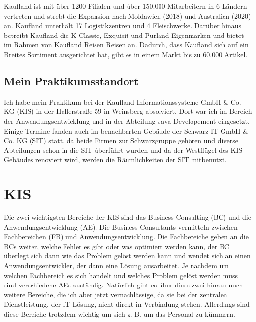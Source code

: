 Kaufland ist mit über 1200 Filialen und über 150.000 Mitarbeitern in 6 Ländern vertreten und strebt die Expansion nach Moldawien (2018) und Australien (2020) an. Kaufland unterhält 17 Logistikzentren und 4 Fleischwerke. Darüber hinaus betreibt Kaufland die            K-Classic, Exquisit und Purland Eigenmarken und bietet im Rahmen von Kaufland Reisen Reisen an. Dadurch, dass Kaufland sich auf ein Breites Sortiment ausgerichtet hat, gibt es in einem Markt bis zu 60.000 Artikel. 

\subsection{Mein Praktikumsstandort}

Ich habe mein Praktikum bei der Kaufland Informationssysteme GmbH \& Co. KG (KIS) in der Hallerstraße 59 in Weinsberg absolviert. Dort war ich im Bereich der Anwendungsentwicklung und in der Abteilung Java-Developement eingesetzt. Einige Termine fanden auch im benachbarten Gebäude der Schwarz IT GmbH \& Co. KG (SIT) statt, da beide Firmen zur Schwarzgruppe gehören und diverse Abteilungen schon in die SIT überführt wurden und da der Westflügel des KIS-Gebäudes renoviert wird, werden die Räumlichkeiten der SIT mitbenutzt. 

\section{KIS}

Die zwei wichtigsten Bereiche der KIS sind das Business Consulting (BC) und die Anwendungsentwicklung (AE). Die Business Consultants vermitteln zwischen Fachbereichen (FB) und Anwendungsentwicklung. Die Fachbereiche geben an die BCs weiter, welche Fehler es gibt oder was optimiert werden kann, der BC überlegt sich dann wie das Problem gelöst werden kann und wendet sich an einen Anwendungsentwickler, der dann eine Lösung ausarbeitet. Je nachdem um welchen Fachbereich es sich handelt und welches Problem gelöst werden muss sind verschiedene AEs zuständig. Natürlich gibt es über diese zwei hinaus noch weitere Bereiche, die ich aber jetzt vernachlässige, da sie bei der zentralen Dienstleistung, der IT-Lösung, nicht direkt in Verbindung stehen. Allerdings sind diese Bereiche trotzdem wichtig um sich z. B. um das Personal zu kümmern.